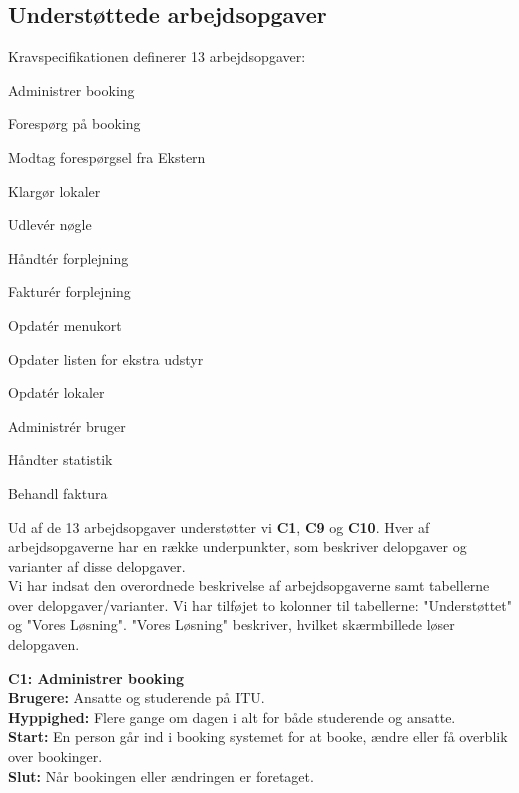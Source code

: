 \subsection*{Understøttede arbejdsopgaver}
\label{Evaluation_KS_workareas}
Kravspecifikationen definerer 13 arbejdsopgaver:
\begin{my_description}
\item[\textbf{C1.}]{Administrer booking}
\item[\textbf{C2.}]{Forespørg på booking}
\item[\textbf{C3.}]{Modtag forespørgsel fra Ekstern}
\item[\textbf{C4.}]{Klargør lokaler}
\item[\textbf{C5.}]{Udlevér nøgle}
\item[\textbf{C6.}]{Håndtér forplejning}
\item[\textbf{C7.}]{Fakturér forplejning}
\item[\textbf{C8.}]{Opdatér menukort}
\item[\textbf{C9.}]{Opdater listen for ekstra udstyr}
\item[\textbf{C10.}]{Opdatér lokaler}
\item[\textbf{C11.}]{Administrér bruger}
\item[\textbf{C12.}]{Håndter statistik}
\item[\textbf{C13.}]{Behandl faktura}
\end{my_description}

Ud af de 13 arbejdsopgaver understøtter vi \textbf{C1}, \textbf{C9} og \textbf{C10}. Hver af arbejdsopgaverne har en række underpunkter, som beskriver delopgaver og varianter af disse delopgaver. 
\\Vi har indsat den overordnede beskrivelse af arbejdsopgaverne samt tabellerne over delopgaver/varianter. Vi har tilføjet to kolonner til tabellerne: "Understøttet" og "Vores Løsning". "Vores Løsning" beskriver, hvilket skærmbillede løser delopgaven.

\textbf{C1: Administrer booking}
\\\textbf{Brugere:} Ansatte og studerende på ITU.\\
\textbf{Hyppighed:} Flere gange om dagen i alt for både studerende og ansatte.\\
\textbf{Start:} En person går ind i booking systemet for at booke, ændre eller få overblik over bookinger.\\
\textbf{Slut:} Når bookingen eller ændringen er foretaget.

